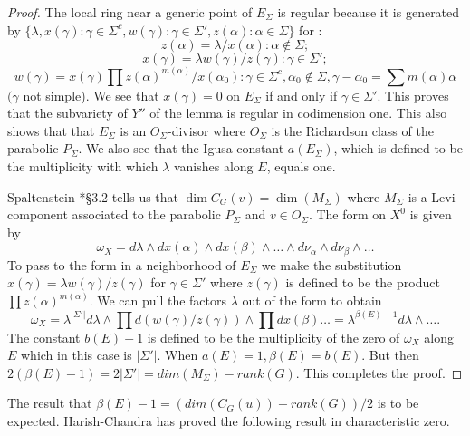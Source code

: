 \documentclass{memo-l}
\theoremstyle{definition}
\theoremstyle{remark}
\numberwithin{section}{chapter}
\numberwithin{equation}{chapter}
\begin{document}
\begin{proof}    The local ring near a generic point of $E_{{\Sigma}}$ is
regular because it is generated by $\{{\lambda},x({\gamma}):{\gamma} \in
{\Sigma}^{c}, w({\gamma}):{\gamma} \in {\Sigma}', z({\alpha}):{\alpha} \in
{\Sigma\} }$  for :
$$
z({\alpha}) = {\lambda}/x({\alpha}) : {\alpha} \notin {\Sigma};
$$
$$
x({\gamma}) = {\lambda}w({\gamma})/z({\gamma}) : {\gamma} \in {\Sigma}';
$$
$$
w({\gamma}) = x({\gamma})\prod z(\alpha)^{m({\alpha})}/x({\alpha}_{0}) : {\gamma} \in {\Sigma}^{c},
{\alpha}_{0} \notin
{\Sigma}, {\gamma}-{\alpha}_{0}=\sum m({\alpha}){\alpha}
$$
$(\gamma$ not simple).
 We see that $x({\gamma})=0$ on $E_{{\Sigma}}$ if and only if ${\gamma} \in
{\Sigma}'$.
 This proves that the subvariety of $Y''$ of the lemma is regular in codimension
one.
 This also shows that that $E_{{\Sigma}}$ is an $O_{{\Sigma}}$-divisor where
$O_{{\Sigma}}$ is the Richardson class of the parabolic $P_{{\Sigma}}$.
 We also see that the Igusa constant $a(E_{{\Sigma}})$, which is defined to
be the multiplicity with which ${\lambda}$ vanishes along $E$, equals one.

   Spaltenstein \cite{MR672610}*{\S3.2} tells us that $\dim C_{G}(v) = \dim(M_{{\Sigma}})$
where $M_{{\Sigma}}$ is a Levi component associated to the parabolic
$P_{{\Sigma}}$ and $v \in O_{{\Sigma}}$.
 The form on $X^{0}$ is given by
$$
{\omega}_{X} = d{\lambda}\wedge
dx({\alpha})\wedge dx({\beta})\wedge \ldots \wedge d{\nu}_{{\alpha}}
\wedge d{\nu}_{{\beta}}\wedge \ldots
$$
To pass to the form in a neighborhood of $E_{{\Sigma}}$ we make the
substitution $x({\gamma}) = {\lambda}w({\gamma})/z({\gamma})$ for ${\gamma}
\in {\Sigma}'$ where $z({\gamma})$ is defined to be the product
$\prod z({\alpha})^{m({\alpha})}$.
 We can pull the factors ${\lambda}$ out of the form to obtain
$$
\omega_{X} = {\lambda}^{\vert {\Sigma}'\vert} d{\lambda}\wedge \prod
d(w({\gamma})/z({\gamma}))\wedge \prod dx({\beta})\ldots
= {\lambda}^{\beta(E)-1}d{\lambda}\wedge\ldots .
$$
The constant $b(E)-1$ is defined to be the multiplicity of the zero of
${\omega}_{X}$ along $E$ which in this case is $\vert {\Sigma}'\vert .$
When $a(E)=1, {\beta}(E) = b(E)$.
 But then $2({\beta}(E)-1) = 2\vert {\Sigma}'\vert  =
dim(M_{{\Sigma}})-rank(G)$.
 This completes the proof.
\end{proof}
{\medskip}



   The result that ${\beta}(E)-1 = (dim(C_{G}(u))-rank(G))/2$ is to be expected.
 Harish-Chandra has proved the following result in characteristic zero.
\end{document}
